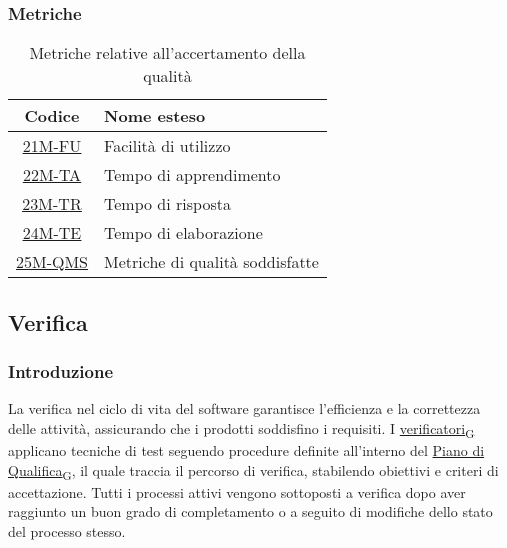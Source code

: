 \newpage

\subsubsection{Metriche}
\begin{table}[!h]
	\centering
	\begin{tabular}{ | c | l | }
		\hline
		\textbf{Codice}                      & \textbf{Nome esteso}            \\
		\hline
		\underline{\hyperlink{21M}{21M-FU}}  & Facilità di utilizzo            \\
        \underline{\hyperlink{22M}{22M-TA}}  & Tempo di apprendimento          \\
        \underline{\hyperlink{23M}{23M-TR}}  & Tempo di risposta               \\
        \underline{\hyperlink{24M}{24M-TE}}  & Tempo di elaborazione           \\
        \underline{\hyperlink{25M}{25M-QMS}} & Metriche di qualità soddisfatte \\
		\hline
	\end{tabular}
	\caption{Metriche relative all'accertamento della qualità}
\end{table}

\subsection{Verifica}
\subsubsection{Introduzione}
La verifica nel ciclo di vita del software garantisce l'efficienza e la correttezza delle attività, assicurando che i prodotti soddisfino i requisiti. I \href{https://7last.github.io/docs/pb/documentazione-interna/glossario\#verificatore}{verificatori\textsubscript{G}} applicano tecniche di test seguendo procedure definite all'interno del \href{https://7last.github.io/docs/pb/documentazione-interna/glossario\#piano-di-qualifica}{Piano di Qualifica\textsubscript{G}}, il quale traccia il percorso di verifica, stabilendo obiettivi e criteri di accettazione. Tutti i processi attivi vengono sottoposti a verifica dopo aver raggiunto un buon grado di completamento o a seguito di modifiche dello stato del processo stesso.

